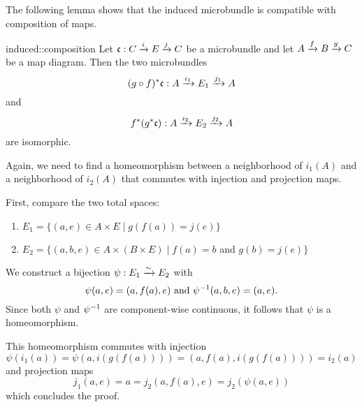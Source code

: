\begin{myparagraph}
    The following lemma shows that the induced microbundle
    is compatible with composition of maps.
\end{myparagraph}

\begin{mylemma}{induced::composition}{}
    Let $\bundledef{\bc}{C}{E}{i}{j}$ be a microbundle and let $A \xto{f} B \xto{g} C$ be a map diagram.
    Then the two microbundles
    \[ \bundledef{\ind{(g \circ f)}\bc}{A}{E_1}{i_1}{j_1} \]
    and
    \[ \bundledef{\ind{f}(\ind{g}\bc)}{A}{E_2}{i_2}{j_2} \]
    are isomorphic.
\end{mylemma}

\begin{myproof}
    Again, we need to find a homeomorphism between a neighborhood of $i_1(A)$ and a neighborhood of $i_2(A)$
    that commutes with injection and projection maps.
    
    First, compare the two total spaces:
    \begin{enumerate}
        \item $E_1 = \{ (a, e) \in A \times E \mid g(f(a)) = j(e)\}$ 
        \item $E_2 = \{ (a, b, e) \in A \times (B \times E) \mid f(a) = b$ and $ g(b) = j(e) \}$
    \end{enumerate}
    We construct a bijection $\psi: E_1 \isomto E_2$ with
    \[ \psi(a, e) = (a, f(a), e) \tand \inv{\psi}(a, b, e) = (a, e).\]
    Since both $\psi$ and $\inv{\psi}$ are component-wise continuous, it follows that $\psi$ is a homeomorphism.

    This homeomorphism commutes with injection
    \[ \psi(i_1(a)) = \psi(a, i(g(f(a)))) = (a, f(a), i(g(f(a)))) = i_2(a) \]
    and projection maps
    \[ j_1(a, e) = a = j_2(a, f(a), e) = j_2(\psi(a, e)) \]
    which concludes the proof.
\end{myproof}